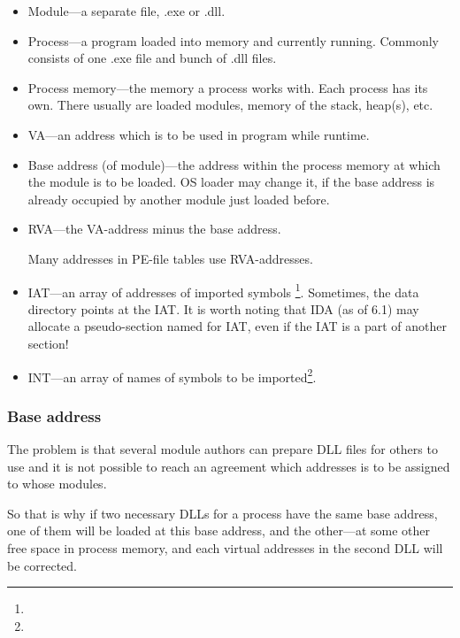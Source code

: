 \begin{itemize}
\item Module---a separate file, .exe or .dll.

\item Process---a program loaded into memory and currently running.  Commonly consists of one .exe file and bunch of .dll files.

\item Process memory---the memory a process works with.  Each process has its own.
There usually are loaded modules, memory of the stack, \gls{heap}(s), etc.

\item \ac{VA}---an address which is to be used in program while runtime.

\item Base address (of module)---the address within the process memory at which the module is to be loaded.
\ac{OS} loader may change it, if the base address is already occupied by another module just loaded before.

\item \ac{RVA}---the \ac{VA}-address minus the base address.

Many addresses in PE-file tables use \ac{RVA}-addresses.


\item \ac{IAT}---an array of addresses of imported symbols \footnote{\PietrekPE}. 
Sometimes, the  data directory points at the \ac{IAT}. 
\label{IDA_idata}
It is worth noting that \ac{IDA} (as of 6.1) may allocate a pseudo-section named  for
\ac{IAT}, even if the \ac{IAT} is a part of another section!

\item \ac{INT}---an array of names of symbols to be imported\footnote{\PietrekPE}.
\end{itemize}

\subsubsection{Base address}

The problem is that several module authors can prepare DLL files for others to use and it is not possible
to reach an agreement which addresses is to be assigned to whose modules.

So that is why if two necessary DLLs for a process have the same base address,
one of them will be loaded at this base address, and the other---at some other free space in process memory,
and each virtual addresses in the second DLL will be corrected.

